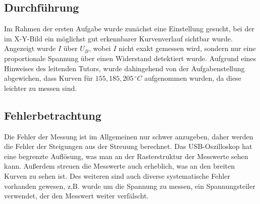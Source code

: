 \subsection{Durchführung}
Im Rahmen der ersten Aufgabe wurde zunächst eine Einstellung gesucht, bei der im X-Y-Bild ein möglichst gut erkennbarer Kurvenverlauf sichtbar wurde. Angezeigt wurde \(I\) über \(U_B\), wobei \(I\) nicht exakt gemessen wird, sondern nur eine proportionale Spannung über einen Widerstand detektiert wurde. Aufgrund eines Hinweises des leitenden Tutors, wurde dahingehend von der Aufgabenstellung abgewichen, dass Kurven für \(155, 185, 205\, ^\circ C\) aufgenommen wurden, da diese leichter zu messen sind.
\subsection{Fehlerbetrachtung}
Die Fehler der Messung ist im Allgemeinen nur schwer anzugeben, daher werden die Fehler der Steigungen aus der Streuung berechnet. Das USB-Oszilloskop hat eine begrenzte Auflösung, was man an der Rasterstruktur der Messwerte sehen kann. Außerdem streuen die Messwerte auch erheblich, was an den breiten Kurven zu sehen ist. Des weiteren sind auch diverse systematische Fehler vorhanden gewesen, z.B. wurde um die Spannung zu messen, ein Spannungsteiler verwendet, der den Messwert weiter verfälscht.
